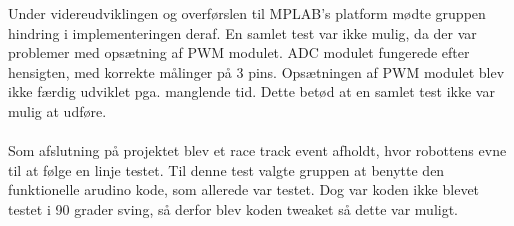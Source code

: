 Under videreudviklingen og overførslen til MPLAB's platform mødte gruppen hindring i implementeringen deraf. En samlet test var ikke mulig, da der var problemer med opsætning af PWM modulet. ADC modulet fungerede efter hensigten, med korrekte målinger på 3 pins. Opsætningen af PWM modulet  blev ikke færdig udviklet pga. manglende tid. Dette betød at en samlet test ikke var mulig at udføre.
\\
\\
Som afslutning på projektet blev et race track event afholdt, hvor robottens evne til at følge en linje testet. Til denne test valgte gruppen at benytte den funktionelle arudino kode, som allerede var testet. Dog var koden ikke blevet testet i 90 grader sving, så derfor blev koden tweaket så dette var muligt.

% 





